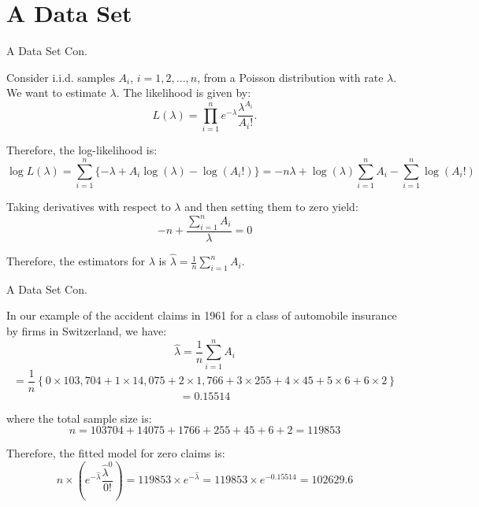 \documentclass{beamer}
\begin{document}
\section{A Data Set}
\begin{frame}{A Data Set Con.}

    {\footnotesize \footnotesize
    \par  Consider i.i.d. samples $A_i$, $i=1,2,...,n$, from a Poisson distribution with rate $\lambda$. We want to estimate $\lambda$. 
    The likelihood is given by:
    \[
    L(\lambda) = \prod_{i=1}^{n} e^{-\lambda} \frac{\lambda^{A_i}}{A_i!}.
    \]
    \par Therefore, the log-likelihood is:
    \[
    \log L(\lambda) = \sum_{i=1}^{n} \{ - \lambda + A_i \log (\lambda) - \log (A_i!) \} 
    = -n \lambda + \log (\lambda) \sum_{i=1}^{n} A_i - \sum_{i=1}^{n} \log (A_i!)
    \]
    \par Taking derivatives with respect to $\lambda$ and then setting them to zero yield:
    \[
    -n + \frac{\sum_{i=1}^n A_i}{\lambda} = 0
    \]
    \par Therefore, the estimators for $\lambda$ is $\hat{\lambda} = \frac{1}{n} \sum\limits_{i=1}^n A_i.$


    }
    
\end{frame}
\begin{frame}{A Data Set Con.}

    {\footnotesize \footnotesize
    \par  In our example of the accident claims in 1961 for a class of automobile insurance by firms in Switzerland, we have:
    \[
    \hat{\lambda} = \frac{1}{n} \sum_{i=1}^n A_i
    \]
    \[
    = \frac{1}{n} \left\{ 0 \times 103,704 + 1 \times 14,075 + 2 \times 1,766 + 
    3 \times 255 + 4 \times 45 + 5 \times 6 + 6 \times 2 \right\}
    \]
    \[
    = 0.15514
    \]
    \par where the total sample size is:
    \[
    n = 103704 + 14075 + 1766 + 255 + 45 + 6 + 2 = 119853
    \]
    \par Therefore, the fitted model for zero claims is:
    \[
    n \times \left( e^{-\hat{\lambda}} \frac{\hat{\lambda}^0}{0!} \right) = 
    119853 \times e^{-\hat{\lambda}} = 119853 \times e^{-0.15514} = 102629.6
    \]

    

    }
    
\end{frame}
\end{document}
